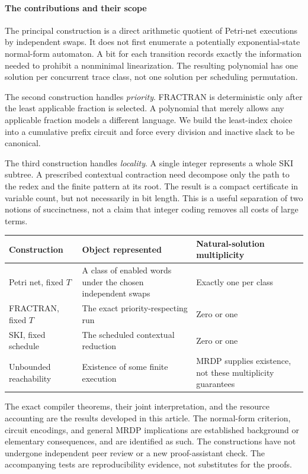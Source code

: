 \documentclass[11pt,a4paper]{article}
\theoremstyle{definition}
\theoremstyle{remark}
\begin{document}
\paragraph{The contributions and their scope}
The principal construction is a direct arithmetic quotient of Petri-net executions by independent swaps. It does not first enumerate a potentially exponential-state normal-form automaton. A bit for each transition records exactly the information needed to prohibit a nonminimal linearization. The resulting polynomial has one solution per concurrent trace class, not one solution per scheduling permutation.

The second construction handles \emph{priority}. FRACTRAN is deterministic only after the least applicable fraction is selected. A polynomial that merely allows any applicable fraction models a different language. We build the least-index choice into a cumulative prefix circuit and force every division and inactive slack to be canonical.

The third construction handles \emph{locality}. A single integer represents a whole SKI subtree. A prescribed contextual contraction need decompose only the path to the redex and the finite pattern at its root. The result is a compact certificate in variable count, but not necessarily in bit length. This is a useful separation of two notions of succinctness, not a claim that integer coding removes all costs of large terms.

\begin{center}
\small
\begin{tabular}{p{.25\linewidth}p{.39\linewidth}p{.27\linewidth}}
\toprule
Construction & Object represented & Natural-solution multiplicity \\
\midrule
Petri net, fixed $T$ & A class of enabled words under the chosen independent swaps & Exactly one per class \\
FRACTRAN, fixed $T$ & The exact priority-respecting run & Zero or one \\
SKI, fixed schedule & The scheduled contextual reduction & Zero or one \\
Unbounded reachability & Existence of some finite execution & MRDP supplies existence, not these multiplicity guarantees \\
\bottomrule
\end{tabular}
\end{center}

The exact compiler theorems, their joint interpretation, and the resource accounting are the results developed in this article. The normal-form criterion, circuit encodings, and general MRDP implications are established background or elementary consequences, and are identified as such. The constructions have not undergone independent peer review or a new proof-assistant check. The accompanying tests are reproducibility evidence, not substitutes for the proofs.
\end{document}
